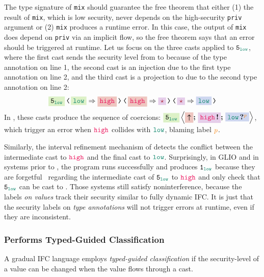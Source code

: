 \noindent The type signature of \texttt{mix} should guarantee the free theorem
that either (1) the result of \texttt{mix}, which is low security, never depends
on the high-security \texttt{priv} argument or (2) \texttt{mix} produces a
runtime error. In this case, the output of \texttt{mix} does depend on
\texttt{priv} via an implicit flow, so the free theorem says that an error
should be triggered at runtime. Let us focus on the three casts applied to
$\key{5}_{\low}$, where the first cast sends the security level from \low to
\high because of the type annotation on line 1, the second cast is an injection
due to the first type annotation on line 2, and the third cast is a projection
to \low due to the second type annotation on line 2:
\[
\cccast{
  \cccast{
    \cccast{\colorbox{White!70!YellowGreen}{$\key{5}_{\low}$}}{\colorbox{White!70!YellowGreen}{\low} \Rightarrow \colorbox{White!80!Maroon}{\high}}
  }{\colorbox{White!80!Maroon}{\high} \Rightarrow \colorbox{White!80!Purple}{\unk}}}
  {\colorbox{White!80!Purple}{\unk} \Rightarrow \colorbox{White!80!NavyBlue}{\low}}
\]
In \Surface, these casts produce the sequence of coercions:
$\colorbox{White!70!YellowGreen}{$\key{5}_{\low}$} \left\langle
\colorbox{White!80!Maroon}{\up} \seq \colorbox{White!80!Purple}{\inj{\high}}
\seq \colorbox{White!80!NavyBlue}{\proj{\low}{p}} \right\rangle$, which trigger
an error when $\high$ collides with $\low$, blaming label $\bl{p}$.

Similarly, the interval refinement mechanism of \GSLRef detects the conflict
between the intermediate cast to $\high$ and the final cast to $\low$.
Surprisingly, in GLIO and in systems prior to \GSLRef \parencite{Disney:2011fv,
  Fennell:2013ab}, the program runs successfully and produces $\key{1}_{\low}$
because they are forgetful~\parencite{Greenberg:2014aa} regarding the
intermediate cast of $\key{5}_{\low}$ to $\high$ and only check that
$\key{5}_{\low}$ can be cast to \low. Those systems still satisfy
noninterference, because the labels \textit{on values} track their security
similar to fully dynamic IFC. It is just that the security labels on
\textit{type annotations} will not trigger errors at runtime, even if they are
inconsistent.

\subsubsection{\Surface Performs Typed-Guided Classification}

A gradual IFC language employs \textit{typed-guided classification} if the
security-level of a value can be changed when the value flows through a cast.

